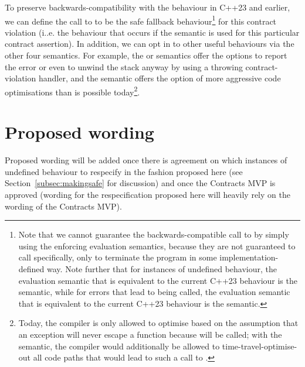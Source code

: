 To preserve backwards-compatibility with the behaviour in C++23 and earlier, we can define the call to  to be the safe fallback behaviour\footnote{Note that we cannot guarantee the backwards-compatible call to  by simply using the enforcing evaluation semantics, because they are not guaranteed to call  specifically, only to terminate the program in some implementation-defined way. Note further that for instances of undefined behaviour, the evaluation semantic that is equivalent to the current C++23 behaviour is the  semantic, while for errors that lead to  being called, the evaluation semantic that is equivalent to the current C++23 behaviour is the  semantic.} for this contract violation (i..e. the behaviour that occurs if the  semantic is used for this particular contract assertion). In addition, we can opt in to other useful behaviours via the other four semantics. For example, the  or  semantics offer the options to report the error or even to unwind the stack anyway by using a throwing contract-violation handler, and the  semantic offers the option of more aggressive code optimisations than is possible today\footnote{Today, the compiler is only allowed to optimise based on the assumption that an exception will never escape a  function because  will be called; with the  semantic, the compiler would additionally be allowed to time-travel-optimise-out all code paths that would lead to such a call to .}.

\section{Proposed wording}

Proposed wording will be added once there is agreement on which instances of undefined behaviour to respecify in the fashion proposed here (see Section~\ref{subsec:makingsafe} for discussion) and once the Contracts MVP is approved (wording for the respecification proposed here will heavily rely on the wording of the Contracts MVP).





\pagebreak %

\renewcommand{\bibname}{References}





